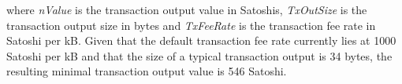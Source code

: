 \begin{appendices}
\noindent
where \emph{nValue} is the transaction output value in Satoshis, \emph{TxOutSize} is the transaction output size in bytes and \emph{TxFeeRate} is the transaction fee rate in Satoshi per kB. Given that the default transaction fee rate currently lies at 1000 Satoshi per kB and that the size of a typical transaction output is 34 bytes, the resulting minimal transaction output value is 546 Satoshi.


%
%		
%	
%		
%		
%		
%		
%		
%		
%	

\end{appendices}
